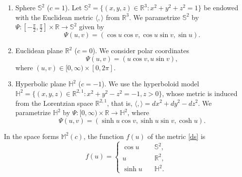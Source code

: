 \documentclass[a4paper,12pt]{amsart}
\theoremstyle{definition}
\def\r{\mathbb R}
\def\h{\mathbb H}
\def\m{\mathbb M}
\def\s{\mathbb S}
\begin{document}
\begin{enumerate}
 \item Sphere $\s^2$ ($c=1$). Let $\s^2=\{(x,y,z)\in\r^3 \colon x^2+y^2+z^2=1\}$ be endowed with the Euclidean metric $\langle,\rangle$ from $\r^3$. We parametrize $\s^2$ by $\Psi\colon [-\frac{\pi}{2},\frac{\pi}{2}]\times \r\to\s^2$ given by 
 $$ \Psi(u,v) = (\cos u\cos v, \cos u\sin v, \sin u). $$
  
 \item Euclidean plane $\r^2$ ($c=0$). We consider polar coordinates 
 $$\Psi(u,v) = (u \cos v, u \sin v),$$
 where $(u,v)\in [0,\infty)\times [0,2\pi]$. 
 
 \item Hyperbolic plane $\h^2$ ($c=-1$). We use the hyperboloid model $\h^2 = \{(x,y,z) \in \r^{2,1} \colon x^2+y^2-z^2=-1, z>0\}$, whose metric is induced from the Lorentzian space $\r^{2,1}$, that is, $\langle,\rangle=dx^2+dy^2-dz^2$. We parametrize $\h^2$ by $\Psi\colon [0,\infty)\times\r\to\h^2$, where  
 $$\Psi(u,v)=(\sinh u\cos v,\sinh u\sin v,\cosh u).$$
 \end{enumerate}

In the space forms $\m^2(c)$, the function $f(u)$ of the metric \eqref{ds} is
\begin{equation}\label{ff}
f(u)=\left\{ \begin{array}{ll}
 \cos u & \quad \s^2,\\
 u &\quad\r^2,\\
 \sinh u &\quad\h^2.
 \end{array}\right.
 \end{equation}
 
\end{document}
